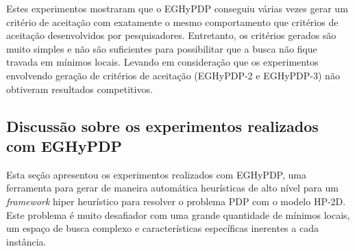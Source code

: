 	Estes experimentos mostraram que o EGHyPDP conseguiu várias vezes gerar um critério de aceitação com exatamente o mesmo comportamento que critérios de aceitação desenvolvidos por pesquisadores. Entretanto, os critérios gerados são muito simples e não são suficientes para possibilitar que a busca não fique travada em mínimos locais. Levando em consideração que os experimentos envolvendo geração de critérios de aceitação (EGHyPDP-2 e EGHyPDP-3) não obtiveram resultados competitivos. 
	
	
	\subsection{Discussão sobre os experimentos realizados com EGHyPDP}
	
	Esta seção apresentou os experimentos realizados com EGHyPDP, uma ferramenta para gerar de maneira automática heurísticas de alto nível para um \textit{framework} hiper heurístico para resolver o problema PDP com o modelo HP-2D. Este problema é muito desafiador com uma grande quantidade de mínimos locais, um espaço de busca complexo e características específicas inerentes a cada instância. 
	

